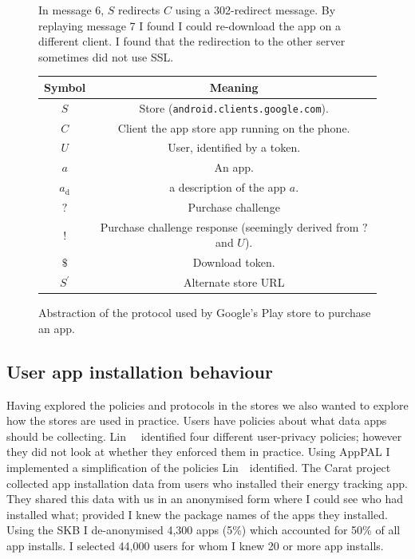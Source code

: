 \documentclass[a4paper]{scrartcl}
\begin{document}
\begin{figure}[!h]
\begin{minipage}{0.48\linewidth}
    {\footnotesize In message 6, $S$ redirects $C$ using a 302-redirect message.
      By replaying message 7 I found I could re-download the app on a different client.
      I found that the redirection to the other server sometimes did not use SSL.}
  \end{minipage}
  \begin{minipage}{0.48\linewidth}
    \begin{tabulary}{\linewidth}{cC}
      \toprule
      Symbol         & Meaning                                                           \\
      \midrule
      $S$            & Store (\texttt{android.clients.google.com}).                      \\
      $C$            & Client the app store app running on the phone.                    \\
      $U$            & User, identified by a token.                                      \\
      $a$            & An app.                                                           \\
      $a_{\text{d}}$ & a description of the app $a$.                                     \\
      $?$            & Purchase challenge                                                \\
      $!$            & Purchase challenge response (seemingly derived from $?$ and $U$). \\
      $\$$           & Download token.                                                   \\
      $S^\prime$     & Alternate store URL                                               \\
      \bottomrule
    \end{tabulary}
  \end{minipage}
  \caption{Abstraction of the protocol used by Google's Play store to purchase an app.}
  \label{fig:protocol}
\end{figure}

\subsection{User app installation behaviour}

Having explored the policies and protocols in the stores we also wanted to explore how the stores are used in practice.
Users have policies about what data apps should be collecting.
Lin~\etal~\citep{Sadeh:2014vq} identified four different user-privacy policies; however they did not look at whether they enforced them in practice.
Using AppPAL I implemented a simplification of the policies Lin~\etal~identified.
The Carat project~\citep{Oliner:2013ht} collected app installation data from users who installed their energy tracking app.
They shared this data with us in an anonymised form where I could see who had installed what; provided I knew the package names of the apps they installed.
Using the \ac{SKB} I de-anonymised 4,300 apps (5\%) which accounted for 50\% of all app installs.
I selected 44,000 users for whom I knew 20 or more app installs.
\end{document}
